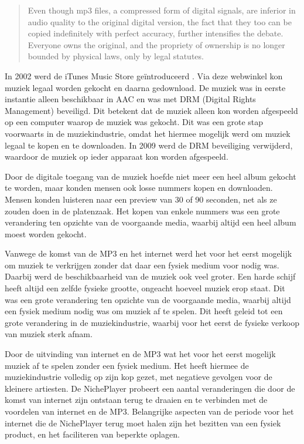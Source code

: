 \begin{quotation}
    Even though mp3 files, a compressed form of digital signals, are inferior in audio quality to the original digital version, the fact that they too can be copied indefinitely with perfect accuracy, further intensifies the debate. Everyone owns the original, and the propriety of ownership is no longer bounded by physical laws, only by legal statutes.
    \citep{lansky2004importance}
\end{quotation}

In 2002 werd de iTunes Music Store geïntroduceerd \citep{chen2010itunes}. Via deze webwinkel kon muziek legaal worden gekocht en daarna gedownload. De muziek was in eerste instantie alleen beschikbaar in AAC en was met DRM (Digital Rights Management) beveiligd. Dit betekent dat de muziek alleen kon worden afgespeeld op een computer waarop de muziek was gekocht. Dit was een grote stap voorwaarts in de muziekindustrie, omdat het hiermee mogelijk werd om muziek legaal te kopen en te downloaden. In 2009 werd de DRM beveiliging verwijderd, waardoor de muziek op ieder apparaat kon worden afgespeeld.

Door de digitale toegang van de muziek hoefde niet meer een heel album gekocht te worden, maar konden mensen ook losse nummers kopen en downloaden. Mensen konden luisteren naar een preview van 30 of 90 seconden, net als ze zouden doen in de platenzaak. Het kopen van enkele nummers was een grote verandering ten opzichte van de voorgaande media, waarbij altijd een heel album moest worden gekocht.

Vanwege de komst van de MP3 en het internet werd het voor het eerst mogelijk om muziek te verkrijgen zonder dat daar een fysiek medium voor nodig was. Daarbij werd de beschikbaarheid van de muziek ook veel groter. Een harde schijf heeft altijd een zelfde fysieke grootte, ongeacht hoeveel muziek erop staat. Dit was een grote verandering ten opzichte van de voorgaande media, waarbij altijd een fysiek medium nodig was om muziek af te spelen. Dit heeft geleid tot een grote verandering in de muziekindustrie, waarbij voor het eerst de fysieke verkoop van muziek sterk afnam.

Door de uitvinding van internet en de MP3 wat het voor het eerst mogelijk muziek af te spelen zonder een fysiek medium. Het heeft hiermee de muziekindustrie volledig op zijn kop gezet, met negatieve gevolgen voor de kleinere artiesten. De NichePlayer probeert een aantal veranderingen die door de komst van internet zijn ontstaan terug te draaien en te verbinden met de voordelen van internet en de MP3. Belangrijke aspecten van de periode voor het internet die de NichePlayer terug moet halen zijn het bezitten van een fysiek product, en het faciliteren van beperkte oplagen.


